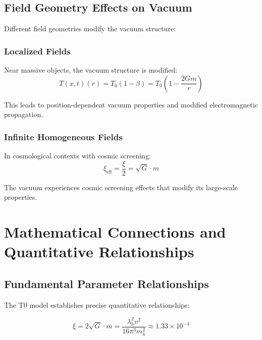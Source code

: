 \documentclass[12pt,a4paper]{article}
\newcommand{\Tfieldt}{T(x,t)}
\newcommand{\Tzero}{T_0}
\begin{document}
	\subsection{Field Geometry Effects on Vacuum}
	\label{subsec:geometry_vacuum_effects}
	
	Different field geometries modify the vacuum structure:
	
	\subsubsection{Localized Fields}
	\label{subsubsec:localized_vacuum}
	
	Near massive objects, the vacuum structure is modified:
	\begin{equation}
		\Tfieldt(r) = \Tzero(1 - \beta) = \Tzero\left(1 - \frac{2Gm}{r}\right)
		\label{eq:localized_vacuum_modification}
	\end{equation}
	
	This leads to position-dependent vacuum properties and modified electromagnetic propagation.
	
	\subsubsection{Infinite Homogeneous Fields}
	\label{subsubsec:infinite_vacuum}
	
	In cosmological contexts with cosmic screening:
	\begin{equation}
		\xi_{\text{eff}} = \frac{\xi}{2} = \sqrt{G} \cdot m
		\label{eq:cosmic_vacuum_screening}
	\end{equation}
	
	The vacuum experiences cosmic screening effects that modify its large-scale properties.
	
	\section{Mathematical Connections and Quantitative Relationships}
	\label{sec:mathematical_connections}
	
	\subsection{Fundamental Parameter Relationships}
	\label{subsec:parameter_relationships}
	
	The T0 model establishes precise quantitative relationships:
	
	\begin{equation}
		\xi = 2\sqrt{G} \cdot m = \frac{\lambda_h^2 v^2}{16\pi^3 m_h^2} \approx 1.33 \times 10^{-4}
		\label{eq:xi_higgs_connection}
	\end{equation}
	
\end{document}
